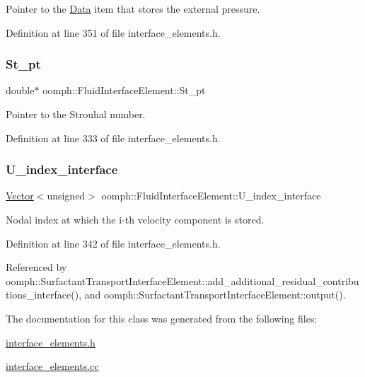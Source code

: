 Pointer to the \hyperlink{classoomph_1_1Data}{Data} item that stores the external pressure. 



Definition at line 351 of file interface\+\_\+elements.\+h.

\mbox{\label{classoomph_1_1FluidInterfaceElement_ae32ade5ea1742938f538e5d5f812bb2a}} 
\subsubsection{\texorpdfstring{St\+\_\+pt}{St\_pt}}
{\footnotesize\ttfamily double$\ast$ oomph\+::\+Fluid\+Interface\+Element\+::\+St\+\_\+pt\hspace{0.3cm}{\ttfamily [private]}}



Pointer to the Strouhal number. 



Definition at line 333 of file interface\+\_\+elements.\+h.

\mbox{\label{classoomph_1_1FluidInterfaceElement_a6a818d9999c68641223edcad217a8c3f}} 
\subsubsection{\texorpdfstring{U\+\_\+index\+\_\+interface}{U\_index\_interface}}
{\footnotesize\ttfamily \hyperlink{classoomph_1_1Vector}{Vector}$<$unsigned$>$ oomph\+::\+Fluid\+Interface\+Element\+::\+U\+\_\+index\+\_\+interface\hspace{0.3cm}{\ttfamily [protected]}}



Nodal index at which the i-\/th velocity component is stored. 



Definition at line 342 of file interface\+\_\+elements.\+h.



Referenced by oomph\+::\+Surfactant\+Transport\+Interface\+Element\+::add\+\_\+additional\+\_\+residual\+\_\+contributions\+\_\+interface(), and oomph\+::\+Surfactant\+Transport\+Interface\+Element\+::output().



The documentation for this class was generated from the following files\+:\begin{DoxyCompactItemize}
\item 
\hyperlink{interface__elements_8h}{interface\+\_\+elements.\+h}\item 
\hyperlink{interface__elements_8cc}{interface\+\_\+elements.\+cc}\end{DoxyCompactItemize}
